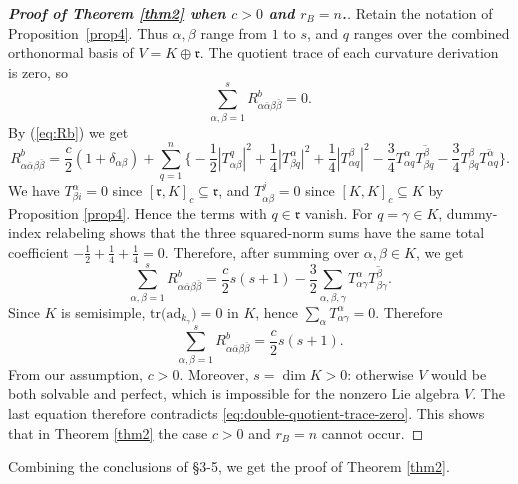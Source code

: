 \documentclass{amsart}
\begin{document}
\begin{proof}[{\bf Proof of Theorem \ref{thm2} when $c>0$ and $r_B=n$.}]

Retain the notation of Proposition~\ref{prop4}.  Thus
$\alpha,\beta$ range from $1$ to $s$, and $q$ ranges over the combined
orthonormal basis of $V=K\oplus\mathfrak r$.  The quotient trace of each
curvature derivation is zero, so
\begin{equation}\label{eq:double-quotient-trace-zero}
 \sum_{\alpha,\beta=1}^s
 R^b_{\alpha\bar\alpha\beta\bar\beta}=0.
\end{equation}
By (\ref{eq:Rb}) we get
\[ R^b_{\alpha\bar\alpha\beta\bar\beta} = \frac{c}{2}(1+\delta_{\alpha \beta}) +\sum_{q=1}^n \big\{ -\frac{1}{2} |T^q_{\alpha \beta}|^2 + \frac{1}{4} |T^{\alpha}_{\beta q}|^2 + \frac{1}{4} |T^{\beta}_{\alpha q}|^2 -\frac{3}{4} T^{\alpha}_{\alpha q} \overline{T^{\beta}_{\beta q} } - \frac{3}{4} T^{\beta}_{\beta q} \overline{T^{\alpha}_{\alpha q} } \big\}.
\]
We have $T^{\alpha}_{\beta i}=0$ since $[{\mathfrak r}, K]_c\subseteq {\mathfrak r}$, and $T^j_{\alpha \beta}=0$ since $[K,K]_c\subseteq K$ by Proposition \ref{prop4}.   {Hence the terms with $q\in\mathfrak r$ vanish. For $q=\gamma\in K$, dummy-index relabeling shows that the three squared-norm sums have the same total coefficient
$-\frac{1}{2}+\frac{1}{4}+\frac{1}{4}=0$. Therefore, after summing over
$\alpha,\beta\in K$, } we get
\[
 \sum_{\alpha,\beta=1}^s
 R^b_{\alpha\bar\alpha\beta\bar\beta}
 =\frac{c}{2}s(s+1)
 -\frac{3}{2}\sum_{\alpha,\beta,\gamma}T^\alpha_{\alpha \gamma}\overline{T^\beta_{\beta \gamma}} .
\]
Since $K$ is semisimple, $\mbox{tr}\big( \mbox{ad}_{k_{\gamma}}\big) =0$ in $K$, hence $\sum_{\alpha}T^{\alpha}_{\alpha \gamma} =0$. Therefore
\begin{equation*}
\sum_{\alpha,\beta=1}^s
 R^b_{\alpha\bar\alpha\beta\bar\beta}
 =\frac{c}{2}s(s+1).
\end{equation*}
From our assumption,  $c>0$. Moreover, $s=\dim K>0$: otherwise  $V$
  would be both solvable and perfect, which is impossible for the nonzero
Lie algebra $V$. The last equation therefore contradicts
\eqref{eq:double-quotient-trace-zero}. This shows that in Theorem
\ref{thm2} the case $c>0$ and $r_B=n$ cannot occur.
 \end{proof}

Combining the conclusions of \S 3-5, we get the proof of Theorem \ref{thm2}.

\vspace{0.3cm}
\end{document}
